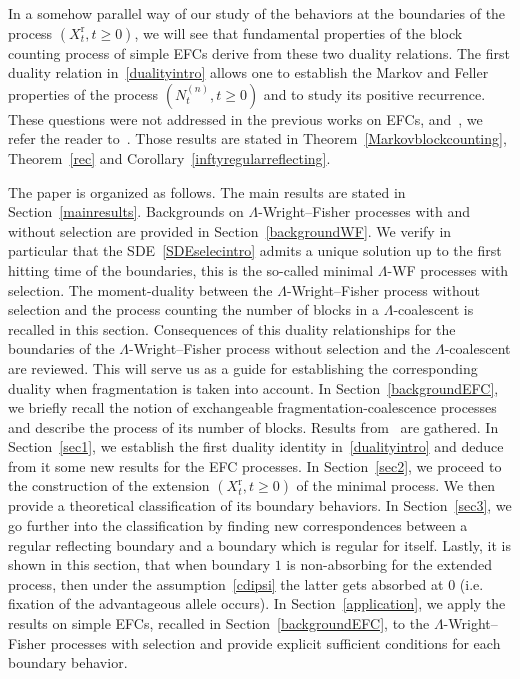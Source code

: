 \documentclass[AHL,Unicode,longabstracts,published]{cedram}
\newcommand{\rmr}{\mathrm{r}}
\begin{document}
In a somehow parallel way of our study of the behaviors at the boundaries of the process $(X^{\rmr}_t,t\geq 0)$, we will see that fundamental properties of the block counting process of simple EFCs derive from these two duality relations. The first duality relation in~\eqref{dualityintro} allows one to establish the Markov and Feller properties of the process $ (N_t^{(n)}, t\geq 0)$ and to study its positive recurrence. These questions were not addressed in the previous works on EFCs, \cite{MR2110018,cdiEFC} and~\cite{explosion}, we refer the reader to~\cite[Remark~2.14]{cdiEFC}. Those results are stated in Theorem~\ref{Markovblockcounting}, Theorem~\ref{rec} and Corollary~\ref{inftyregularreflecting}.



The paper is organized as follows. The main results are stated in Section~\ref{mainresults}. Backgrounds on $\Lambda$-Wright--Fisher processes with and without selection are provided in Section~\ref{backgroundWF}. We verify in particular that the SDE~\eqref{SDEselecintro} admits a unique solution up to the first hitting time of the boundaries, this is the so-called minimal $\Lambda$-WF processes with selection. The moment-duality between the $\Lambda$-Wright--Fisher process without selection and the process counting the number of blocks in a $\Lambda$-coalescent is recalled in this section. Consequences of this duality relationships for the boundaries of the $\Lambda$-Wright--Fisher process without selection and the $\Lambda$-coalescent are reviewed. This will serve us as a guide for establishing the corresponding duality when fragmentation is taken into account. In Section~\ref{backgroundEFC}, we briefly recall the notion of exchangeable fragmentation-coalescence processes and describe the process of its number of blocks. Results from~\cite{cdiEFC} are gathered. In Section~\ref{sec1}, we establish the first duality identity in~\eqref{dualityintro} and deduce from it some new results for the EFC processes. In Section~\ref{sec2}, we proceed to the construction of the extension $(X_t^{\rmr},t\geq 0)$ of the minimal process. We then provide a theoretical classification of its boundary behaviors. In Section~\ref{sec3}, we go further into the classification by finding new correspondences between a regular reflecting boundary and a boundary which is regular for itself. Lastly, it is shown in this section, that when boundary $1$ is non-absorbing for the extended process, then under the assumption~\eqref{cdipsi} the latter gets absorbed at $0$ (i.e. fixation of the advantageous allele occurs). In Section~\ref{application}, we apply the results on simple EFCs, recalled in Section~\ref{backgroundEFC}, to the $\Lambda$-Wright--Fisher processes with selection and provide explicit sufficient conditions for each boundary behavior.
\end{document}
